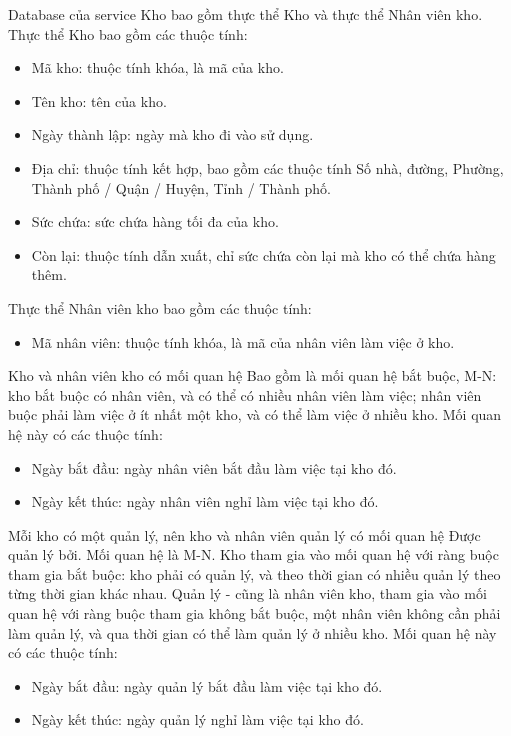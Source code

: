 \par Database của service Kho bao gồm thực thể Kho và thực thể Nhân viên kho. Thực thể Kho bao gồm các thuộc tính:
\begin{itemize}
    \item Mã kho: thuộc tính khóa, là mã của kho.
    \item Tên kho: tên của kho.
    \item Ngày thành lập: ngày mà kho đi vào sử dụng.
    \item Địa chỉ: thuộc tính kết hợp, bao gồm các thuộc tính Số nhà, đường, Phường, Thành phố / Quận / Huyện, Tỉnh / Thành phố.
    \item Sức chứa: sức chứa hàng tối đa của kho.
    \item Còn lại: thuộc tính dẫn xuất, chỉ sức chứa còn lại mà kho có thể chứa hàng thêm.
\end{itemize}

\par Thực thể Nhân viên kho bao gồm các thuộc tính:
\begin{itemize}
    \item Mã nhân viên: thuộc tính khóa, là mã của nhân viên làm việc ở kho.
\end{itemize}

\par Kho và nhân viên kho có mối quan hệ Bao gồm là mối quan hệ bắt buộc, M-N: kho bắt buộc có nhân viên, và có thể có nhiều nhân viên làm việc; nhân viên buộc phải làm việc ở ít nhất một kho, và có thể làm việc ở nhiều kho. Mối quan hệ này có các thuộc tính:
\begin{itemize}
    \item Ngày bắt đầu: ngày nhân viên bắt đầu làm việc tại kho đó.
    \item Ngày kết thúc: ngày nhân viên nghỉ làm việc tại kho đó.
\end{itemize}

\par Mỗi kho có một quản lý, nên kho và nhân viên quản lý có mối quan hệ Được quản lý bởi. Mối quan hệ là M-N. Kho tham gia vào mối quan hệ với ràng buộc tham gia bắt buộc: kho phải có quản lý, và theo thời gian có nhiều quản lý theo từng thời gian khác nhau. Quản lý - cũng là nhân viên kho, tham gia vào mối quan hệ với ràng buộc tham gia không bắt buộc, một nhân viên không cần phải làm quản lý, và qua thời gian có thể làm quản lý ở nhiều kho. Mối quan hệ này có các thuộc tính:
\begin{itemize}
    \item Ngày bắt đầu: ngày quản lý bắt đầu làm việc tại kho đó.
    \item Ngày kết thúc: ngày quản lý nghỉ làm việc tại kho đó.
\end{itemize}

